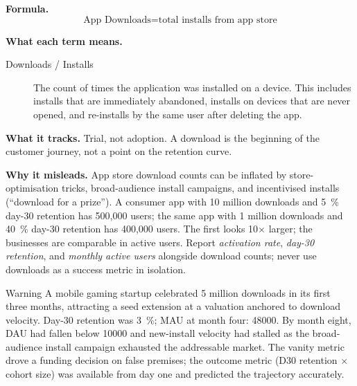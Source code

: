 \textbf{Formula.}
\[
  \text{App Downloads} = \text{total installs from app store}
\]

\textbf{What each term means.}
\begin{description}
  \item[Downloads / Installs] The count of times the application was installed on a device.
    This includes installs that are immediately abandoned, installs on devices that are never
    opened, and re-installs by the same user after deleting the app.
\end{description}

\textbf{What it tracks.} Trial, not adoption. A download is the beginning of the customer
journey, not a point on the retention curve.

\textbf{Why it misleads.} App store download counts can be inflated by store-optimisation
tricks, broad-audience install campaigns, and incentivised installs (``download for a
prize''). A consumer app with 10 million downloads and \qty{5}{\percent} day-30 retention
has 500,000 users; the same app with 1 million downloads and \qty{40}{\percent} day-30
retention has 400,000 users. The first looks 10$\times$ larger; the businesses are
comparable in active users. Report \emph{activation rate}, \emph{day-30 retention}, and
\emph{monthly active users} alongside download counts; never use downloads as a success
metric in isolation.

\begin{admonition}{Warning}
A mobile gaming startup celebrated 5 million downloads in its first three months, attracting
a seed extension at a  valuation anchored to download velocity. Day-30
retention was \qty{3}{\percent}; MAU at month four: \num{48000}. By month eight, DAU had
fallen below \num{10000} and new-install velocity had stalled as the broad-audience install
campaign exhausted the addressable market. The vanity metric drove a funding decision on
false premises; the outcome metric (D30 retention $\times$ cohort size) was available from
day one and predicted the trajectory accurately.
\end{admonition}

